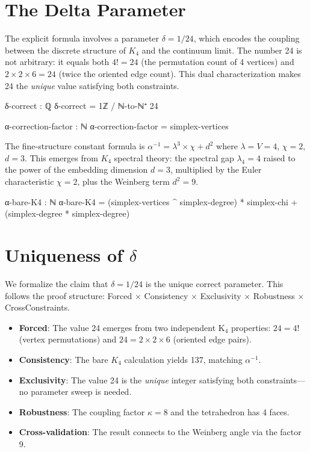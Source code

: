 \documentclass[11pt,a4paper]{book}
\begin{document}
\section{The Delta Parameter}

The explicit formula involves a parameter $\delta = 1/24$, which encodes the coupling 
between the discrete structure of $K_4$ and the continuum limit. The number 24 is not 
arbitrary: it equals both $4! = 24$ (the permutation count of 4 vertices) and 
$2 \times 2 \times 6 = 24$ (twice the oriented edge count). This dual characterization 
makes 24 the \emph{unique} value satisfying both constraints.

\begin{code}
δ-correct : ℚ
δ-correct = 1ℤ / ℕ-to-ℕ⁺ 24

α-correction-factor : ℕ
α-correction-factor = simplex-vertices
\end{code}

The fine-structure constant formula is $\alpha^{-1} = \lambda^3 \times \chi + d^2$
where $\lambda = V = 4$, $\chi = 2$, $d = 3$. This emerges from $K_4$ spectral theory:
the spectral gap $\lambda_4 = 4$ raised to the power of the embedding dimension $d = 3$,
multiplied by the Euler characteristic $\chi = 2$, plus the Weinberg term $d^2 = 9$.

\begin{code}
α-bare-K4 : ℕ
α-bare-K4 = (simplex-vertices ^ simplex-degree) * simplex-chi + (simplex-degree * simplex-degree)
\end{code}

\section{Uniqueness of \texorpdfstring{$\delta$}{delta}}

We formalize the claim that $\delta = 1/24$ is the unique correct parameter. This follows 
the proof structure: Forced $\times$ Consistency $\times$ Exclusivity $\times$ Robustness 
$\times$ CrossConstraints.
\begin{itemize}
\item \textbf{Forced}: The value 24 emerges from two independent K$_4$ properties: 
  $24 = 4!$ (vertex permutations) and $24 = 2 \times 2 \times 6$ (oriented edge pairs).
\item \textbf{Consistency}: The bare $K_4$ calculation yields 137, matching $\alpha^{-1}$.
\item \textbf{Exclusivity}: The value 24 is the \emph{unique} integer satisfying both 
  constraints---no parameter sweep is needed.
\item \textbf{Robustness}: The coupling factor $\kappa = 8$ and the tetrahedron has 4 faces.
\item \textbf{Cross-validation}: The result connects to the Weinberg angle via the factor 9.
\end{itemize}
\end{document}
